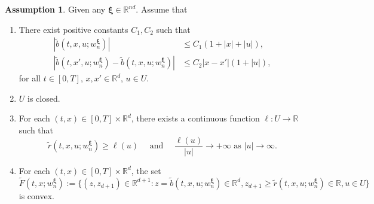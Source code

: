 \documentclass[11pt]{article}
\numberwithin{equation}{section}
\theoremstyle{plain}
\theoremstyle{definition}
\newtheorem{assumption}{Assumption}
\theoremstyle{remark}
\newcommand{\R}{\mathbb{R}}
\begin{document}
\begin{assumption} \label{assu:existence}
    Given any $\bm{\xi} \in \R^{nd}$. Assume that 
    \begin{enumerate}
        \item There exist positive constants $C_1, C_2$ such that 
        \begin{equation*}
            \begin{aligned}
                |\tilde{b}(t,x,u;w_n^{\bm{\xi}})| &\le C_1 (1 +|x| +|u|), \\
                |\tilde{b}(t,x',u;w_n^{\bm{\xi}}) - \tilde{b}(t,x,u;w_n^{\bm{\xi}})| &\le C_2|x-x'|(1 + |u|), 
            \end{aligned}
        \end{equation*}
        for all $t\in [0,T]$, $x, x'\in \R^d$, $u\in U$. 
        \item $U$ is closed. 
        \item For each $(t,x)\in [0,T]\times \R^d$, there exists a continuous function $\ell:U\to \R$ such that 
        \begin{equation*}
            \tilde{r}(t,x,u;w_n^{\bm{\xi}}) \ge \ell(u) \quad \text{ and }\quad \frac{\ell(u)}{|u|} \to +\infty \text{ as } |u|\to \infty. 
        \end{equation*}
        \item For each $(t,x)\in [0,T]\times \R^d$, the set 
        \begin{equation*}
            \tilde{F}(t,x;w_n^{\bm{\xi}}) := \{(z,z_{d+1})\in \R^{d+1}: z=\tilde{b}(t,x,u;w_n^{\bm{\xi}})\in \R^d, z_{d+1} \ge \tilde{r}(t,x,u;w_n^{\bm{\xi}})\in \R, u\in U\}
        \end{equation*}
        is convex. 
    \end{enumerate}
\end{assumption}
\end{document}
